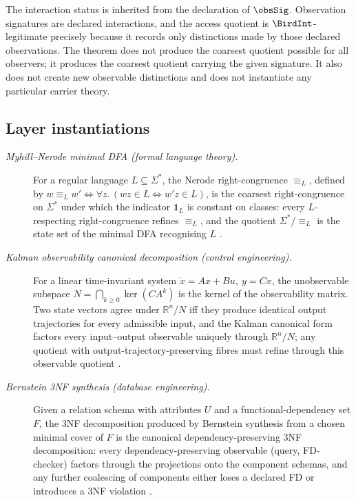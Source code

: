 \documentclass[11pt]{article}
\theoremstyle{definition}
\begin{document}
The interaction status is inherited from the declaration of
\(\obsSig\).  Observation signatures are declared interactions, and
the access quotient is \(\BirdInt\)-legitimate precisely because it
records only distinctions made by those declared observations.  The
theorem does not produce the coarsest quotient possible for all
observers; it produces the coarsest quotient carrying the given
signature.  It also does not create new observable distinctions and
does not instantiate any particular carrier theory.

\subsection*{Layer instantiations}\label{layer-inst:F10}

\begin{description}
\item[\emph{Myhill--Nerode minimal {DFA} (formal language theory).}]
For a regular language \(L\subseteq\Sigma^*\), the Nerode
right-congruence \(\equiv_L\), defined by
\(w\equiv_L w'\Leftrightarrow\forall z.\,(wz\in L\Leftrightarrow w'z\in L)\),
is the coarsest right-congruence on \(\Sigma^*\) under which the
indicator \(\mathbf 1_L\) is constant on classes: every
\(L\)-respecting right-congruence refines \(\equiv_L\), and the
quotient \(\Sigma^*/\!\!\equiv_L\) is the state set of the minimal
DFA recognising \(L\)
\citep{Nerode1958LinearAutomatonTransformations}.

\item[\emph{Kalman observability canonical decomposition (control
engineering).}]
For a linear time-invariant system \(\dot x=Ax+Bu,\ y=Cx\), the
unobservable subspace
\(N=\bigcap_{k\ge 0}\ker(CA^k)\) is the kernel of the observability
matrix.  Two state vectors agree under \(\mathbb R^n/N\) iff they
produce identical output trajectories for every admissible input,
and the Kalman canonical form factors every input--output
observable uniquely through \(\mathbb R^n/N\); any quotient with
output-trajectory-preserving fibres must refine through this
observable quotient
\citep{Kalman1963MathematicalDescription}.

\item[\emph{Bernstein 3{NF} synthesis (database engineering).}]
Given a relation schema with attributes \(U\) and a
functional-dependency set \(F\), the 3NF decomposition produced by
Bernstein
synthesis from a chosen minimal cover of \(F\) is the canonical
dependency-preserving 3NF decomposition: every dependency-preserving
observable (query, FD-checker) factors through the projections onto
the component schemas, and any further coalescing of components
either loses a declared FD or introduces a 3NF violation
\citep{Bernstein1976Synthesizing3NF}.


\end{description}
\end{document}
